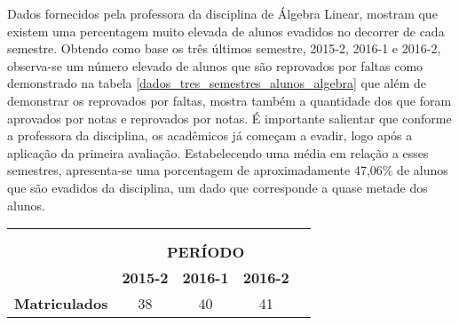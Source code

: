 \noindent Dados fornecidos pela professora da disciplina de Álgebra Linear, mostram que existem uma percentagem muito elevada de alunos evadidos no decorrer de cada semestre. Obtendo como base os três últimos semestre, 2015-2, 2016-1 e 2016-2, observa-se um número elevado de alunos que são reprovados por faltas como demonstrado na tabela \ref{dados_tres_semestres_alunos_algebra} que além de demonstrar os reprovados por faltas, mostra também a quantidade dos que foram aprovados por notas e reprovados por notas. É importante salientar que conforme a professora da disciplina, os acadêmicos já começam a evadir, logo após a aplicação da primeira avaliação. Estabelecendo uma média em relação a esses semestres, apresenta-se uma porcentagem de aproximadamente 47,06\% de alunos que são evadidos da disciplina, um dado que corresponde a quase metade dos alunos.
\begin{table}[!htp]
    \centering
    \begin{tabular}{lcccl}
                                                                            & \multicolumn{1}{l}{}                                         & \multicolumn{1}{l}{}                                         & \multicolumn{1}{l}{}                                         &  \\
                                                                            & \multicolumn{1}{l}{}                                         & \multicolumn{1}{l}{}                                         & \multicolumn{1}{l}{}                                         &  \\ \cline{1-4}
\multicolumn{1}{|l|}{}                                                      & \multicolumn{3}{c|}{\textbf{PERÍODO}}                                                                                                                                                      &  \\ \cline{2-4}
\multicolumn{1}{|l|}{\multirow{-2}{*}{}}                                    & \multicolumn{1}{c|}{\cellcolor[HTML]{EFEFEF}\textbf{2015-2}} & \multicolumn{1}{c|}{\cellcolor[HTML]{EFEFEF}\textbf{2016-1}} & \multicolumn{1}{c|}{\cellcolor[HTML]{EFEFEF}\textbf{2016-2}} &  \\ \cline{1-4}
\multicolumn{1}{|c|}{\textbf{Matriculados}}                                 & \multicolumn{1}{c|}{38}                                      & \multicolumn{1}{c|}{40}                                      & \multicolumn{1}{c|}{41}                                      &  \\ \cline{1-4}

\end{tabular}
\end{table}
